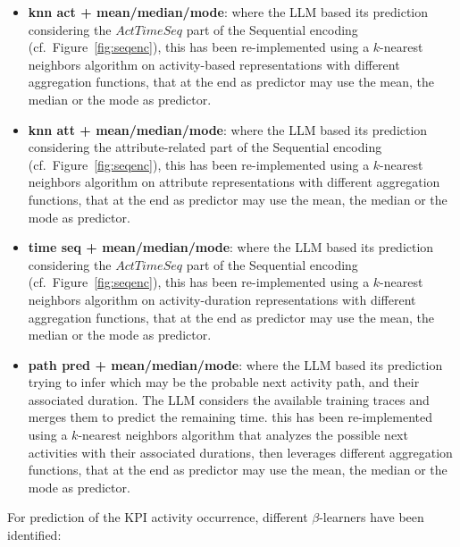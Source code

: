 \documentclass[manuscript,screen,review]{acmart}
\begin{document}
\begin{itemize}
\item \textbf{knn act + mean/median/mode}: where the LLM based its prediction considering the $ActTimeSeq$ part of the Sequential encoding (cf.\ Figure~\ref{fig:seqenc}), this has been re-implemented using a $k$-nearest neighbors algorithm on activity-based representations with different aggregation functions, that at the end as predictor may use the mean, the median or the mode as predictor.

\item \textbf{knn att + mean/median/mode}: where the LLM based its prediction considering the attribute-related part of the Sequential encoding (cf.\ Figure~\ref{fig:seqenc}), this has been re-implemented using a $k$-nearest neighbors algorithm on attribute representations with different aggregation functions, that at the end as predictor may use the mean, the median or the mode as predictor.

\item \textbf{time seq + mean/median/mode}: where the LLM based its prediction considering the $ActTimeSeq$ part of the Sequential encoding (cf.\ Figure~\ref{fig:seqenc}), this has been re-implemented using a $k$-nearest neighbors algorithm on activity-duration representations with different aggregation functions, that at the end as predictor may use the mean, the median or the mode as predictor.

\item \textbf{path pred + mean/median/mode}: where the LLM based its prediction trying to infer which may be the probable next activity path, and their associated duration. The LLM considers the available training traces and merges them to predict the remaining time. this has been re-implemented using a $k$-nearest neighbors algorithm that analyzes the possible next activities with their associated durations, then leverages different aggregation functions, that at the end as predictor may use the mean, the median or the mode as predictor.

\end{itemize}

For prediction of the KPI activity occurrence, different $\beta$-learners have been identified:
\end{document}
